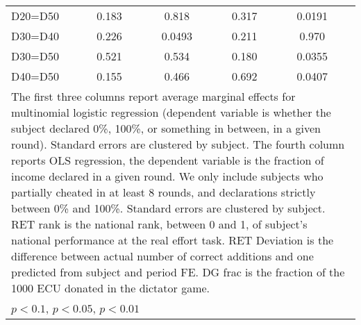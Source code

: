 \begin{tabular}{l|cccccc|cc}
D20=D50         &    0.183         &         &    0.818         &         &    0.317         &         &   0.0191         &         \\
D30=D40         &    0.226         &         &   0.0493         &         &    0.211         &         &    0.970         &         \\
D30=D50         &    0.521         &         &    0.534         &         &    0.180         &         &   0.0355         &         \\
D40=D50         &    0.155         &         &    0.466         &         &    0.692         &         &   0.0407         &         \\
\hline\hline
\multicolumn{9}{p{16cm}}{\tiny The first three columns report average marginal effects for multinomial logistic regression (dependent variable is whether the subject declared 0\%, 100\%, or something in between, in a given round). Standard errors are clustered by subject. The fourth column reports OLS regression, the dependent variable is the fraction of income declared in a given round. We only include subjects who partially cheated in at least 8 rounds, and declarations strictly between 0\% and 100\%. Standard errors are clustered by subject. RET rank is the national rank, between 0 and 1, of subject's national performance at the real effort task. RET Deviation is the difference between actual number of correct additions and one predicted from subject and period FE. DG frac is the fraction of the 1000 ECU donated in the dictator game.}\\
\multicolumn{9}{l}{\tiny \sym{*} \(p<0.1\), \sym{**} \(p<0.05\), \sym{***} \(p<0.01\)}\\
\end{tabular}